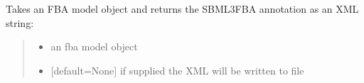 \documentclass[letterpaper,12pt,english]{sphinxmanual}
\begin{document}
\begin{fulllineitems}
\label{\detokenize{api/io:cbmpy.CBXML.xml_getSBML2FBAannotation}}
\pysigstartsignatures
\pysiglinewithargsret
{}
{\sphinxparamcomma {}}
{}
\pysigstopsignatures
\sphinxAtStartPar
Takes an FBA model object and returns the SBML3FBA annotation as an XML string:
\begin{quote}\begin{description}
\begin{itemize}
\item {} 
\sphinxAtStartPar
{} \textendash{} an fba model object

\item {} 
\sphinxAtStartPar
{} \textendash{} {[}default=None{]} if supplied the XML will be written to file 

\end{itemize}

\end{description}\end{quote}

\end{fulllineitems}

\end{document}
